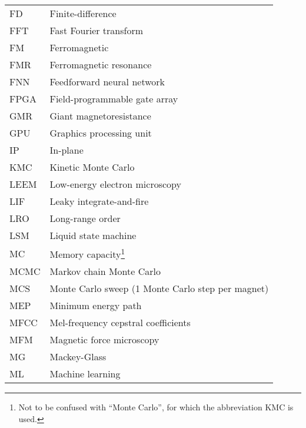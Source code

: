{\begin{longtable}[l]{ll}
        FD    & Finite-difference                           \\
        FFT   & Fast Fourier transform                      \\
        FM    & Ferromagnetic                               \\
        FMR   & Ferromagnetic resonance                     \\
        FNN   & Feedforward neural network                  \\
        FPGA  & Field-programmable gate array               \\
        GMR   & Giant magnetoresistance                     \\
        GPU   & Graphics processing unit                    \\
        IP    & In-plane                                    \\
        KMC   & Kinetic Monte Carlo                         \\
        LEEM  & Low-energy electron microscopy              \\
        LIF   & Leaky integrate-and-fire                    \\
        LRO   & Long-range order                            \\
        LSM   & Liquid state machine                        \\
        MC    & Memory capacity\footnote{Not to be confused with ``Monte Carlo'', for which the abbreviation KMC is used.} \\
        MCMC  & Markov chain Monte Carlo                    \\
        MCS   & Monte Carlo sweep (1 Monte Carlo step per magnet) \\
        MEP   & Minimum energy path                         \\
        MFCC  & Mel-frequency cepstral coefficients         \\
        MFM   & Magnetic force microscopy                   \\
        MG    & Mackey-Glass                                \\
        ML    & Machine learning                            \\

\end{longtable}}
